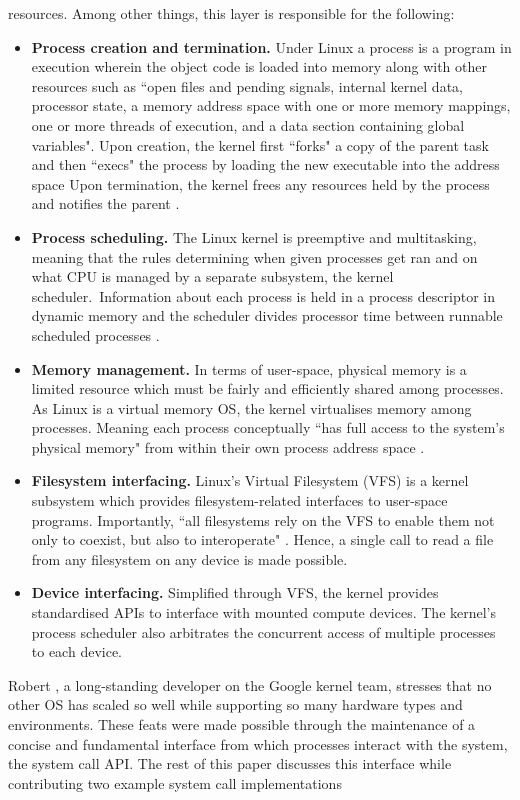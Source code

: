 \documentclass{article}
\begin{document}
resources. Among other things, this layer is responsible for the 
following:
\vspace{1.8mm}
\begin{itemize}
  \item \textbf{Process creation and termination.} Under Linux a process
  is a program in execution wherein the object code is loaded 
  into memory along with other resources such as ``open files and pending signals, internal kernel data, processor state, a memory address space with one or more memory mappings, one or more threads of execution, and a data section containing global variables".
   Upon creation, the kernel first ``forks" 
a copy of the parent task and then ``execs" the process by loading the new
executable into the address space Upon termination, the kernel frees any resources
held by the process and notifies the parent \citep{Love}.
 \item \textbf{Process scheduling.} The Linux kernel is preemptive and multitasking, meaning
 that the rules determining when given processes get ran and on what CPU is managed by
 a separate subsystem, the kernel scheduler.\ Information about each process is held in a
process descriptor in dynamic memory and the scheduler divides processor time 
between runnable scheduled processes \citep{Love7, Kerrisk}.
 \item \textbf{Memory management.} In terms of user-space, 
 physical memory is a limited resource which must be fairly and efficiently shared among
 processes. As Linux is a virtual memory OS, the kernel virtualises memory among processes. 
 Meaning each process conceptually ``has full access to the system's physical memory" 
 from within their own process address space \citep{Love}.
 \item \textbf{Filesystem interfacing.} Linux's Virtual Filesystem (VFS) is a kernel
 subsystem which provides filesystem-related interfaces to user-space programs. Importantly,
 ``all filesystems rely on the VFS to enable them not only to coexist, but also to interoperate"
  \citep{Love}. Hence, a single call to read a file from any filesystem on any device is made possible. 
 \newpage
 \item \textbf{Device interfacing.} Simplified through VFS, the
 kernel provides standardised APIs to interface with mounted compute devices. 
 The kernel's process scheduler also arbitrates the concurrent access of multiple
processes to each device.
\end{itemize}

\noindent Robert \citet{Love7}, a long-standing developer on the Google kernel team, 
stresses that no other OS has scaled so well while supporting so many 
hardware types and environments. These feats were made possible 
through the maintenance of a concise and fundamental interface 
from which processes interact with the system, the system call
API. The rest of this paper discusses this interface while 
contributing two example system call implementations
 
\end{document}
